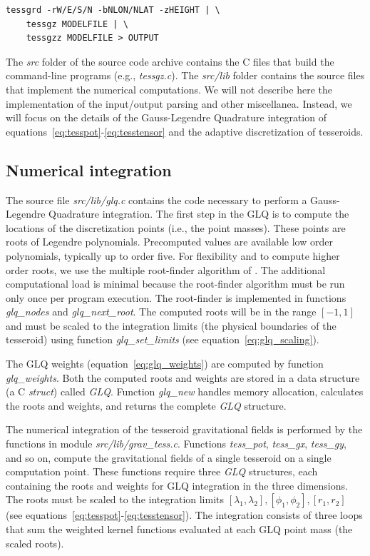 \documentclass[paper,twocolumn,twoside]{geophysics}
\begin{document}
\begin{verbatim}
tessgrd -rW/E/S/N -bNLON/NLAT -zHEIGHT | \
    tessgz MODELFILE | \
    tessgzz MODELFILE > OUTPUT
\end{verbatim}

The \emph{src} folder of the source code archive
contains the C files that build the command-line programs
(e.g., \emph{tessgz.c}).
The \emph{src/lib} folder contains
the source files that implement the numerical computations.
We will not describe here the implementation of the input/output parsing and
other miscellanea.
Instead, we will focus on the details of the Gauss-Legendre Quadrature
integration of equations~\ref{eq:tesspot}-\ref{eq:tesstensor}
and the adaptive discretization of tesseroids.



\subsection{Numerical integration}

The source file \emph{src/lib/glq.c}
contains the code necessary to perform
a Gauss-Legendre Quadrature integration.
The first step in the GLQ is to compute the
locations of the discretization points (i.e., the point masses).
These points are roots of Legendre polynomials.
Precomputed values are available low order polynomials,
typically up to order five.
For flexibility and to compute higher order roots,
we use the multiple root-finder algorithm of
\citet{Barrera-Figueroa2006}.
The additional computational load is minimal
because the root-finder algorithm
must be run only once per program execution.
The root-finder is implemented in functions
\emph{glq\_nodes} and \emph{glq\_next\_root}.
The computed roots will be in the range $[-1, 1]$
and must be scaled to the integration limits
(the physical boundaries of the tesseroid)
using function \emph{glq\_set\_limits} (see equation~\ref{eq:glq_scaling}).

The GLQ weights (equation~\ref{eq:glq_weights})
are computed by function \emph{glq\_weights}.
Both the computed roots and weights are stored in a data structure
(a C \emph{struct}) called \emph{GLQ}.
Function \emph{glq\_new}
handles memory allocation,
calculates the roots and weights,
and returns the complete \emph{GLQ} structure.

The numerical integration of the tesseroid gravitational fields
is performed by the functions in module \emph{src/lib/grav\_tess.c}.
Functions \emph{tess\_pot}, \emph{tess\_gx}, \emph{tess\_gy}, and so on,
compute the gravitational fields of a single tesseroid
on a single computation point.
These functions require three \emph{GLQ} structures,
each containing the roots and weights
for GLQ integration in the three dimensions.
The roots must be scaled to the
integration limits
$[\lambda_1, \lambda_2], [\phi_1, \phi_2], [r_1, r_2]$
(see equations~\ref{eq:tesspot}-\ref{eq:tesstensor}).
The integration consists of three loops
that sum the weighted kernel functions
evaluated at each GLQ point mass (the scaled roots).
\end{document}
